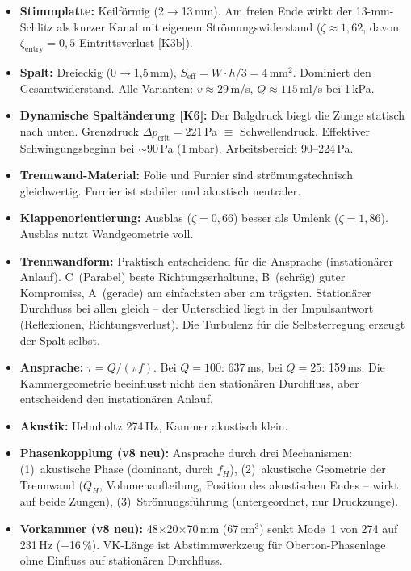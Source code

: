 \documentclass[11pt,a4paper]{article}
\begin{document}
\begin{itemize}[leftmargin=5mm, itemsep=3pt]
\item \textbf{Stimmplatte:} Keilförmig (2$\rightarrow$13\,mm). Am freien Ende wirkt der 13-mm-Schlitz als kurzer Kanal mit eigenem Strömungswiderstand ($\zeta \approx 1{,}62$, davon $\zeta_\text{entry} = 0{,}5$ Eintrittsverlust [K3b]).

\item \textbf{Spalt:} Dreieckig (0$\rightarrow$1{,}5\,mm), $S_\text{eff} = W \cdot h/3 = 4$\,mm$^2$. Dominiert den Gesamtwiderstand. Alle Varianten: $v \approx 29$\,m/s, $Q \approx 115$\,ml/s bei 1\,kPa.

\item \textbf{Dynamische Spaltänderung [K6]:} Der Balgdruck biegt die Zunge statisch nach unten. Grenzdruck $\Delta p_\text{crit} = 221$\,Pa $\equiv$ Schwellendruck. Effektiver Schwingungsbeginn bei $\sim 90$\,Pa (1\,mbar). Arbeitsbereich 90--224\,Pa.

\item \textbf{Trennwand-Material:} Folie und Furnier sind strömungstechnisch gleichwertig. Furnier ist stabiler und akustisch neutraler.

\item \textbf{Klappenorientierung:} Ausblas ($\zeta = 0{,}66$) besser als Umlenk ($\zeta = 1{,}86$). Ausblas nutzt Wandgeometrie voll.

\item \textbf{Trennwandform:} Praktisch entscheidend für die Ansprache (instationärer Anlauf). C~(Parabel) beste Richtungserhaltung, B~(schräg) guter Kompromiss, A~(gerade) am einfachsten aber am trägsten. Stationärer Durchfluss bei allen gleich -- der Unterschied liegt in der Impulsantwort (Reflexionen, Richtungsverlust). Die Turbulenz für die Selbsterregung erzeugt der Spalt selbst.

\item \textbf{Ansprache:} $\tau = Q/(\pi f)$. Bei $Q = 100$: 637\,ms, bei $Q = 25$: 159\,ms. Die Kammergeometrie beeinflusst nicht den stationären Durchfluss, aber entscheidend den instationären Anlauf.

\item \textbf{Akustik:} Helmholtz 274\,Hz, Kammer akustisch klein.
\item \textbf{Phasenkopplung (v8 neu):} Ansprache durch drei Mechanismen: (1)~akustische Phase (dominant, durch $f_H$), (2)~akustische Geometrie der Trennwand ($Q_H$, Volumenaufteilung, Position des akustischen Endes -- wirkt auf beide Zungen), (3)~Strömungsführung (untergeordnet, nur Druckzunge).
\item \textbf{Vorkammer (v8 neu):} 48$\times$20$\times$70\,mm (67\,cm$^3$) senkt Mode~1 von 274 auf 231\,Hz ($-$16\,\%). VK-Länge ist Abstimmwerkzeug für Oberton-Phasenlage ohne Einfluss auf stationären Durchfluss.
\end{itemize}
\end{document}

